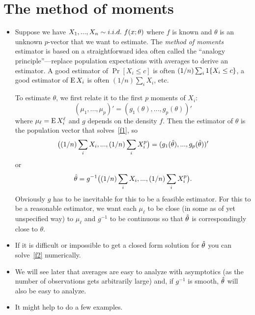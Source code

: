 \section{The method of moments}

\begin{itemize}[leftmargin=0pt]
\item Suppose we have $X_1,...,X_n \sim \iid\ f(x; \theta)$ where $f$ is known
  and $\theta$ is an unknown $p$-vector that we want to estimate.  The
  \emph{method of moments} estimator is based on a straightforward
  idea often called the ``analogy principle''---replace population
  expectations with averages to derive an estimator.  A good estimator
  of $\Pr[X_i \leq c]$ is often $(1/n) \sum_i \operatorname{1}\{X_i \leq c\}$, a good
  estimator of $\operatorname{E} X_i$ is often $(1/n) \sum_i X_i$, etc.

  To estimate $\theta$, we first relate it to the first $p$ moments of
  $X_i$:
  \begin{equation}\label{f1}
    (\mu_1,...,\mu_p)' = (g_1(\theta),...,g_p(\theta))'
  \end{equation}
  where $\mu_\ell = \operatorname{E} X_i^\ell$ and $g$ depends on the density $f$.  Then the
  estimator of $\theta$ is the population vector that solves~\eqref{f1},
  so
  \begin{equation}\label{f2}
    \big((1/n) \sum_i X_i,...,(1/n) \sum_i X_i^p\big)
    = (g_1(\hat{\theta}),...,g_p(\hat{\theta}))'
  \end{equation}
  or
  \begin{equation*}
    \hat{\theta} = g^{-1}\big((1/n) \sum_i X_i,...,(1/n) \sum_i X_i^p\big).
  \end{equation*}
  Obviously $g$ has to be inevitable for this to be a feasible
  estimator.  For this to be a reasonable estimator, we want each
  $\mu_\ell$ to be close (in some as of yet unspecified way) to $\mu_\ell$ and
  $g^{-1}$ to be continuous so that $\hat{\theta}$ is correspondingly close to
  $\theta$.

\item If it is difficult or impossible to get a closed form solution
  for $\hat{\theta}$ you can solve~\eqref{f2} numerically.

\item We will see later that averages are easy to analyze with
  asymptotics (as the number of observations gets arbitrarily large)
  and, if $g^{-1}$ is smooth, $\hat{\theta}$ will also be easy to analyze.

\item It might help to do a few examples.


\end{itemize}

